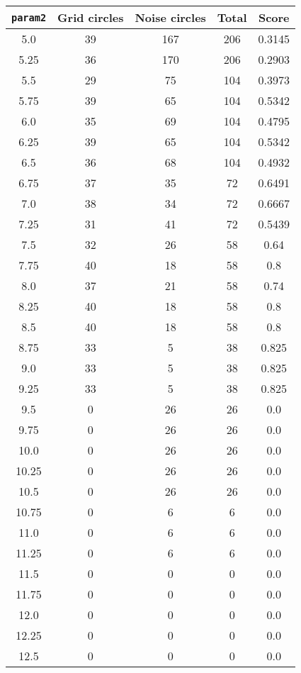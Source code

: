 \documentclass[letterpaper, 12pt]{article}
\begin{document}
\begin{longtable}{|c|c|c|c|c|}
\hline
\textbf{\texttt{param2}} & \textbf{Grid circles} & \textbf{Noise circles} & \textbf{Total} & \textbf{Score} \\
\hline
5.0 & 39 & 167 & 206 & 0.3145 \\
\hline
5.25 & 36 & 170 & 206 & 0.2903 \\
\hline
5.5 & 29 & 75 & 104 & 0.3973 \\
\hline
5.75 & 39 & 65 & 104 & 0.5342 \\
\hline
6.0 & 35 & 69 & 104 & 0.4795 \\
\hline
6.25 & 39 & 65 & 104 & 0.5342 \\
\hline
6.5 & 36 & 68 & 104 & 0.4932 \\
\hline
6.75 & 37 & 35 & 72 & 0.6491 \\
\hline
7.0 & 38 & 34 & 72 & 0.6667 \\
\hline
7.25 & 31 & 41 & 72 & 0.5439 \\
\hline
7.5 & 32 & 26 & 58 & 0.64 \\
\hline
7.75 & 40 & 18 & 58 & 0.8 \\
\hline
8.0 & 37 & 21 & 58 & 0.74 \\
\hline
8.25 & 40 & 18 & 58 & 0.8 \\
\hline
8.5 & 40 & 18 & 58 & 0.8 \\
\hline
8.75 & 33 & 5 & 38 & 0.825 \\
\hline
9.0 & 33 & 5 & 38 & 0.825 \\
\hline
9.25 & 33 & 5 & 38 & 0.825 \\
\hline
9.5 & 0 & 26 & 26 & 0.0 \\
\hline
9.75 & 0 & 26 & 26 & 0.0 \\
\hline
10.0 & 0 & 26 & 26 & 0.0 \\
\hline
10.25 & 0 & 26 & 26 & 0.0 \\
\hline
10.5 & 0 & 26 & 26 & 0.0 \\
\hline
10.75 & 0 & 6 & 6 & 0.0 \\
\hline
11.0 & 0 & 6 & 6 & 0.0 \\
\hline
11.25 & 0 & 6 & 6 & 0.0 \\
\hline
11.5 & 0 & 0 & 0 & 0.0 \\
\hline
11.75 & 0 & 0 & 0 & 0.0 \\
\hline
12.0 & 0 & 0 & 0 & 0.0 \\
\hline
12.25 & 0 & 0 & 0 & 0.0 \\
\hline
12.5 & 0 & 0 & 0 & 0.0 \\
\hline

\end{longtable}
\end{document}
